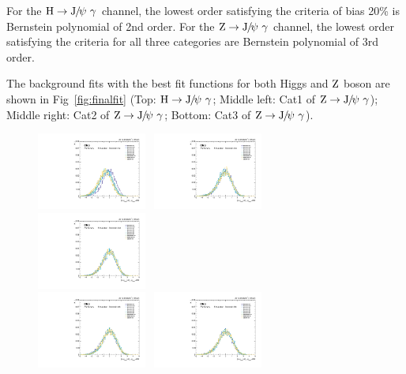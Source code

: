 		For the $\mathrm{H}\to{\mathrm{J}\hspace{-.08em}/\hspace{-.14em}\psi}\ \gamma$ channel, the lowest order satisfying the criteria of bias 20\% is Bernstein polynomial of 2nd order. For the $\mathrm{Z}\to{\mathrm{J}\hspace{-.08em}/\hspace{-.14em}\psi}\ \gamma$ channel, the lowest order satisfying the criteria for all three categories are Bernstein polynomial of 3rd order.
		
		The background fits with the best fit functions for both Higgs and $\mathrm{Z}$ boson are shown in Fig~\ref{fig:finalfit} (Top: $\mathrm{H}\to{\mathrm{J}\hspace{-.08em}/\hspace{-.14em}\psi}\ \gamma$; Middle left: Cat1 of $\mathrm{Z}\to{\mathrm{J}\hspace{-.08em}/\hspace{-.14em}\psi}\ \gamma$); Middle right: Cat2 of $\mathrm{Z}\to{\mathrm{J}\hspace{-.08em}/\hspace{-.14em}\psi}\ \gamma$; Bottom: Cat3 of $\mathrm{Z}\to{\mathrm{J}\hspace{-.08em}/\hspace{-.14em}\psi}\ \gamma$). 

\begin{figure}[p]
  \centering
  \includegraphics[width=0.32\textwidth]{Fig/BiasStudy/Pull/HJpsiG/pull_fitfunc0_leastbias}~
  \includegraphics[width=0.32\textwidth]{Fig/BiasStudy/Pull/HJpsiG/pull_fitfunc1_leastbias}~
  \includegraphics[width=0.32\textwidth]{Fig/BiasStudy/Pull/HJpsiG/pull_fitfunc2_leastbias}\\
  \includegraphics[width=0.32\textwidth]{Fig/BiasStudy/Pull/HJpsiG/pull_fitfunc3_leastbias}~
  \includegraphics[width=0.32\textwidth]{Fig/BiasStudy/Pull/HJpsiG/pull_fitfunc4_leastbias}~

\end{figure}
